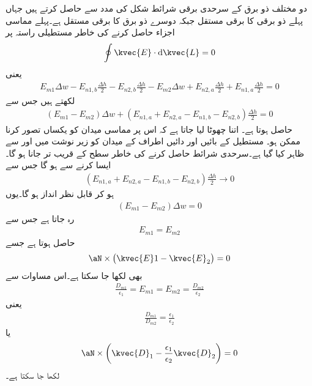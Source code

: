 دو مختلف ذو برق کے سرحدی برقی شرائط شکل  کی مدد سے حاصل کرتے ہیں جہاں پہلے ذو برقی کا برقی مستقل  جبکہ دوسرے ذو برق کا برقی مستقل  ہے۔پہلے مماسی اجزاء حاصل کرنے کی خاطر مستطیلی راستہ  پر
\begin{align*}
\oint \kvec{E} \cdot \dif \kvec{L}=0
\end{align*}
یعنی
\begin{align*}
E_{m1} \Delta w-E_{n1,b}\frac{\Delta h}{2}-E_{n2,b} \frac{\Delta h}{2}-E_{m2}\Delta w+E_{n2,a}\frac{\Delta h}{2}+E_{n1,a} \frac{\Delta h}{2}=0 
\end{align*} 
لکھتے ہیں جس سے
\begin{align*}
(E_{m1} -E_{m2})\Delta w +(E_{n1,a}+E_{n2,a}-E_{n1,b}-E_{n2,b})\frac{\Delta h}{2}=0
\end{align*} 
حاصل ہوتا ہے۔ اتنا چھوٹا لیا جاتا ہے کہ اس پر مماسی میدان کو یکساں تصور کرنا ممکن ہو۔ مستطیل کے بائیں اور دائیں اطراف کے میدان کو زیر نوشت میں  اور  سے ظاہر کیا گیا ہے۔سرحدی شرائط حاصل کرنے کی خاطر سطح کے قریب تر جانا ہو گا۔ایسا کرنے سے  ہو گا جس سے
\begin{align*}
(E_{n1,a}+E_{n2,a}-E_{n1,b}-E_{n2,b})\frac{\Delta h}{2} \to 0
\end{align*} 
ہو کر قابل نظر انداز ہو گا۔یوں
\begin{align*}
(E_{m1} -E_{m2})\Delta w =0
\end{align*} 
رہ جاتا ہے جس سے 
\begin{align}\label{مساوات_کپیسٹر_دو_ذو_برق_سرحدی_شرائط_الف}
E_{m1} =E_{m2}
\end{align} 
حاصل ہوتا ہے جسے
\begin{align}\label{مساوات_کپیسٹر_دو_ذو_برق_سمتی_سرحدی_شرائط_الف}
\aN \times \left(\kvec{E}1-\kvec{E}_2 \right)=0
\end{align} 
بھی لکھا جا سکتا ہے۔اس مساوات سے
\begin{align*}
\frac{D_{m1}}{\epsilon_1}=E_{m1}=E_{m2}=\frac{D_{m2}}{\epsilon_2}
\end{align*}
یعنی
\begin{align}\label{مساوات_کپیسٹر_دو_ذو_برق_سرحدی_شرائط_ب}
\frac{D_{m1}}{D_{m2}}=\frac{\epsilon_1}{\epsilon_2}
\end{align}
یا
\begin{align}\label{مساوات_کپیسٹر_دو_ذو_برق_سمتی_سرحدی_شرائط_ب}
\aN \times \left(\kvec{D}_1-\frac{\epsilon_1}{\epsilon_2} \kvec{D}_2 \right)=0
\end{align}
لکھا جا سکتا ہے۔

